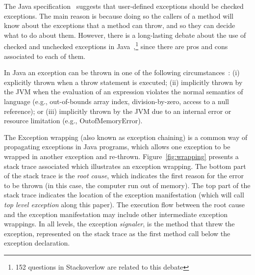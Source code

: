\documentclass[conference]{IEEEtran}
\begin{document}
The Java specification~\cite{gosling2000java} suggests that user-defined
exceptions should be checked exceptions. The main reason is because doing so the
callers of a method will know about the exceptions that a method can throw, and
so they can decide what to do about them. However, there is a long-lasting
debate about the use of checked and unchecked exceptions in
Java~\cite{javatut,stackoverlow,debate},\footnote{152 questions in Stackoverlow
are related to this debate} since there are pros and cons associated to each of
them.


In Java an exception can be thrown in one of the following
circumstances~\cite{gosling2000java}: (i) explicitly thrown when a throw statement is executed; 
(ii) implicitly thrown by the JVM when the evaluation of an expression
 violates the normal semantics of language (e.g., out-of-bounds array index,
division-by-zero, access to a null reference); or (iii) implicitly thrown by
the JVM due to an internal error or resource limitation (e.g.,
OutofMemoryError). 




The Exception wrapping (also known as exception chaining) is a common way of 
propagating exceptions in Java programs, 
which allows one exception to be wrapped in another exception and re-thrown. 
Figure~\ref{fig:wrapping} presents a stack trace associated which illustrates an
exception wrapping. The bottom part of the stack trace is the \emph{root cause}, which indicates the
first reason for the error to be thrown (in this case, the computer run out of
memory). The top part of the stack trace indicates the location of the exception
manifestation (which will call \emph{top level exception} along this paper). The
execution flow  between the root cause and the exception manifestation may
include other intermediate exception wrappings. In all levels, the exception
\emph{signaler}, is the method that threw the exception, represented on the
stack trace as the first method call below the exception declaration.
\end{document}
